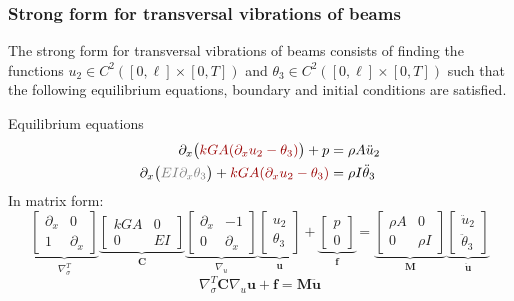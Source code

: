 \documentclass[aspectratio=169]{beamer}
\begin{document}
\begin{frame}
  \frametitle{Strong form for transversal vibrations of beams}
  \small The strong form for transversal vibrations of beams consists of finding the functions $u_{2}\in C^2([0,\ell]\times[0,T])$ and $\theta_{3}\in C^2([0,\ell]\times[0,T])$ such that the following equilibrium equations, boundary and initial conditions are satisfied.
  \begin{block}{Equilibrium equations}
    \vspace{-.5cm}
    \begin{align*}
      \partial_{x}\big({\color{darkred}kGA(\partial_{x}u_{2}-\theta_{3})}\big)+p                                      & =\rho A\ddot u_{2}      \\
      \partial_{x}\big({\color{gray}EI\partial_{x}\theta_{3}}\big)+{\color{darkred}kGA(\partial_{x}u_{2}-\theta_{3})} & =\rho I\ddot \theta_{3} \\
    \end{align*}
    \vspace{-1cm}\newline\small In matrix form:
    $$\underbrace{\begin{bmatrix}
          \partial_{x} & 0            \\
          1            & \partial_{x}
        \end{bmatrix}}_\text{$\nabla_{\sigma}^{T}$}
      \underbrace{\begin{bmatrix}
          kGA & 0  \\
          0   & EI
        \end{bmatrix}}_\text{$\mathbf C$}
      \underbrace{\begin{bmatrix}
          \partial_{x} & -1           \\
          0            & \partial_{x}
        \end{bmatrix}}_\text{$\nabla_{u}$}
      \underbrace{\begin{bmatrix}
          u_{2} \\
          \theta_{3}
        \end{bmatrix}}_\text{$\mathbf u$}
      +
      \underbrace{\begin{bmatrix}
          p \\
          0
        \end{bmatrix}}_\text{$\mathbf f$}
      =
      \underbrace{\begin{bmatrix}
          \rho A & 0      \\
          0      & \rho I
        \end{bmatrix}}_\text{$\mathbf M$}
      \underbrace{\begin{bmatrix}
          \ddot u_{2} \\
          \ddot \theta_{3}
        \end{bmatrix}}_\text{$\mathbf{\ddot u}$}
    $$
    $$\nabla_{\sigma}^{T}\mathbf C\nabla_{u}\mathbf u+\mathbf f=\mathbf {M \ddot u}$$
  \end{block}
\end{frame}
\end{document}
